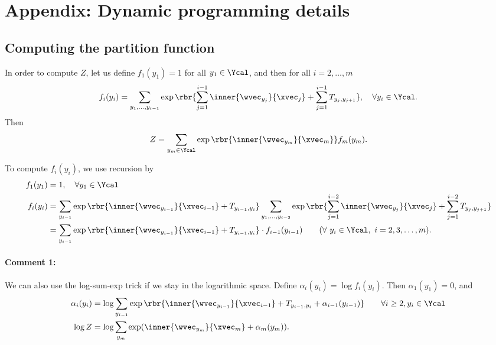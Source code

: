 \documentclass[11pt]{report}
\begin{document}
\section{Appendix: Dynamic programming details}

\subsection{Computing the partition function}
\label{sec:partition}

In order to compute $Z$, let us define $f_1(y_1) = 1$ for all $y_1 \in \Ycal$, and then for all $i = 2, \ldots, m$
\begin{align}
	f_i(y_i) = \sum_{y_1, \ldots, y_{i-1}} \exp \rbr{\sum_{j=1}^{i-1} \inner{\wvec_{y_j}}{\xvec_j} + \sum_{j=1}^{i-1} T_{y_j, y_{j+1}}}, \quad \forall y_i \in \Ycal.
\end{align}
Then
\begin{align}
	Z = \sum_{y_m \in \Ycal} \exp \rbr{\inner{\wvec_{y_m}}{\xvec_m}} f_m(y_m) .
\end{align}

To compute $f_i(y_i)$, we use recursion by
\begin{align}
	\label{eq:rec_Z_forward_1}
	f_1(y_1) &= 1, \quad \forall y_1 \in \Ycal \\
	f_i(y_i) &= \sum_{y_{i-1}} \exp \rbr{\inner{\wvec_{y_{i-1}}}{\xvec_{i-1}} + T_{y_{i-1}, y_i}}
	\sum_{y_1, \ldots, y_{i-2}} \exp \rbr{\sum_{j=1}^{i-2} \inner{\wvec_{y_j}}{\xvec_j} + \sum_{j=1}^{i-2} T_{y_j, y_{j+1}}} \\
	\label{eq:rec_Z_forward_2}
	&= \sum_{y_{i-1}} \exp \rbr{\inner{\wvec_{y_{i-1}}}{\xvec_{i-1}} + T_{y_{i-1}, y_i}}  \cdot f_{i-1}(y_{i-1})  \qquad (\forall\ y_i \in \Ycal, \ i = 2, 3, \ldots, m).	 
\end{align}

\paragraph{Comment 1:}
We can also use the log-sum-exp trick if we stay in the logarithmic space. 
Define $\alpha_i(y_i) = \log f_i(y_i)$.
Then $\alpha_1(y_1) = 0$, and
\begin{align}
	\alpha_i(y_i) &= \log \sum_{y_{i-1}} \exp \rbr{\inner{\wvec_{y_{i-1}}}{\xvec_{i-1}} + T_{y_{i-1}, y_i} + \alpha_{i-1}(y_{i-1})} \qquad \forall i \ge 2, y_i \in \Ycal\\
	\log Z &= \log \sum_{y_m} \exp (\inner{\wvec_{y_m}}{\xvec_m} + \alpha_m(y_m)).
\end{align}
\end{document}
